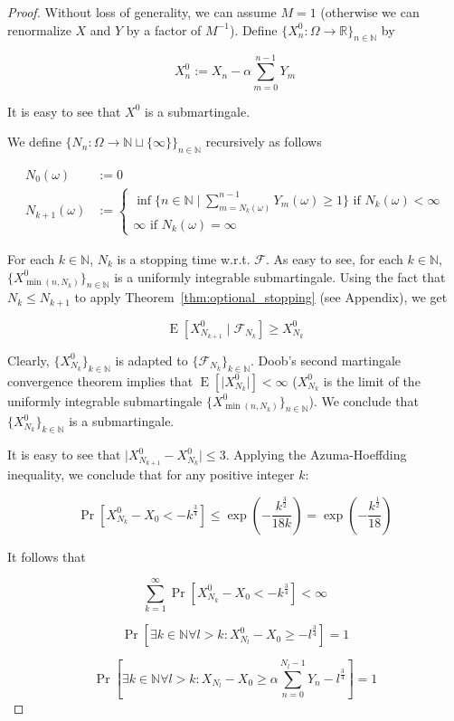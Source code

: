 \documentclass[11pt]{article}
\theoremstyle{definition}
\theoremstyle{plain}
\newcommand{\Nats}{\mathbb{N}}
\newcommand{\Reals}{\mathbb{R}}
\newcommand{\A}[1]{\lvert #1 \rvert}
\newcommand{\Sq}[2]{\{#1\}_{#2 \in \Nats}}
\newcommand{\Sqn}[1]{\Sq{#1}{n}}
\DeclareMathOperator{\E}{E}
\newcommand{\F}{\mathcal{F}}
\begin{document}
\begin{proof}

Without loss of generality, we can assume ${M = 1}$ (otherwise we can renormalize ${X}$ and ${Y}$ by a factor of ${M^{-1}}$). Define ${\Sqn{X^0_n: \Omega \rightarrow \Reals}}$ by

$$X^0_n := X_n - \alpha \sum_{m=0}^{n-1} Y_m$$

It is easy to see that ${X^0}$ is a submartingale.

We define ${\Sqn{N_n:\Omega \rightarrow \Nats \sqcup \{\infty\}}}$ recursively as follows

\begin{align*}
N_0(\omega) &:= 0 \\ 
N_{k+1}(\omega) &:= \begin{cases}\inf \{n \in \Nats \mid \sum_{m=N_k(\omega)}^{n-1} Y_m(\omega) \geq 1\} \text{ if } N_k(\omega) < \infty\\\infty \text{ if } N_k(\omega) = \infty\end{cases}
\end{align*}

For each $k \in \Nats$, $N_k$ is a stopping time w.r.t. ${\F}$. As easy to see, for each $k \in \Nats$, ${\Sqn{X^0_{\min(n,N_k)}}}$ is a uniformly integrable submartingale. Using the fact that ${N_{k} \leq N_{k+1}}$ to apply Theorem~\ref{thm:optional_stopping} (see Appendix), we get

$$\E[X^0_{N_{k+1}} \mid \F_{N_k}] \geq X^0_{N_{k}}$$

Clearly, ${\Sq{X^0_{N_k}}{k}}$ is adapted to ${\Sq{\F_{N_k}}{k}}$. Doob's second martingale convergence theorem implies that ${\E[\A{X^0_{N_k}}] < \infty}$ (${X^0_{N_k}}$ is the limit of the uniformly integrable submartingale ${\Sqn{X^0_{\min(n,N_k)}}}$). We conclude that ${\Sq{X^0_{N_k}}{k}}$ is a submartingale.

It is easy to see that ${\A{X^0_{N_{k+1}}-X^0_{N_k}}} \leq 3$. Applying the Azuma-Hoeffding inequality, we conclude that for any positive integer ${k}$:

$$\Pr[X^0_{N_k} - X_0 < -k^{\frac{3}{4}}] \leq \exp(-\frac{k^{\frac{3}{2}}}{18k})=\exp(-\frac{k^{\frac{1}{2}}}{18})$$

It follows that

$$\sum_{k=1}^\infty \Pr[X^0_{N_k} - X_0 < -k^{\frac{3}{4}}] < \infty$$

$$\Pr[\exists k \in \Nats \forall l > k: X^0_{N_l} - X_0 \geq -l^{\frac{3}{4}}] = 1$$

$$\Pr[\exists k \in \Nats \forall l > k: X_{N_l} - X_0 \geq \alpha \sum_{n=0}^{N_l - 1} Y_n - l^{\frac{3}{4}}] = 1$$


\end{proof}
\end{document}
